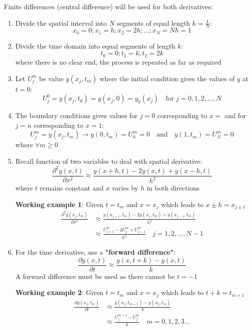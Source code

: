 \documentclass[10pt,a4paper]{article}
\begin{document}
Finite differences (central difference) will be used for both derivatives:
\begin{enumerate}
    \item Divide the spatial interval into $N$ segments of equal length $h=\frac{1}{N}$:
    $$
        x_0=0;x_1=h;x_2=2h;\dots;x_N=Nh=1
    $$

    \item Divide the time domain into equal segments of length $k$:
    $$
        t_0=0;t_1=k;t_2=2k
    $$
    where there is no clear end, the process is repeated as far as required

    \item Let $U_j^m$ be value $y(x_j,t_m)$ where the initial condition gives the values of $y$ at $t=0$:
    $$
        U_j^0=y(x_j,t_0)=y(x_j,0) = y_0(x_j) \quad \text{for } j=0,1,2,\dots, N
    $$

    \item The boundary conditions gives values for $j=0$ corresponding to $x=$ and for $j=n$
    corresponding to $x=1$:
    $$
        U_j^m=y(x_j,t_m) \rightarrow y(0,t_m) = U_0^m = 0 \quad \text{and} \quad y(1,t_m)=U_N^m = 0
    $$
    where $\forall m \geq 0$

    \item Recall function of two variables to deal with spatial derivative:
    $$
        \frac{\partial^2y(x,t)}{\partial x^2} \approx \frac{y(x+h,t)-2y(x,t)+y(x-h,t)}{h^2}
    $$
    where $t$ remains constant and $x$ varies by $h$ in both directions \par 

    \textbf{Working example 1}: Given $t=t_m$ and $x=x_j$ which leads to $x\pm h = x_{j\pm 1}$
    \begin{align*}
        \frac{\partial^2 y(x_j,t_m)}{\partial x^2} &\approx \frac{y(x_{j+1},t_m) - 2y(x_j,t_m)+y(x_{j-1},t_m)}{h^2} \\
        &\approx \frac{U_{j+1}^m - 2U_j^m + U_{j-1}^m}{h^2} \quad j=1,2,\dots,N-1
    \end{align*}

    \item For the time derivative, use a \textbf{"forward difference"}:
    $$
        \frac{\partial y(x,t)}{\partial t} \approx \frac{y(x,t+k)-y(x,t)}{k}
    $$
    A forward difference must be used as there cannot be $t=-1$ \par 

    \textbf{Working example 2}: Given $t=t_m$ and $x=x_j$ which leads to $t+k = t_{m+1}$
    \begin{align*}
        \frac{\partial y(x_j,t_m)}{\partial t} &\approx \frac{y(x_j,t_{m+1})-y(x_j,t_m)}{k} \\
        &\approx \frac{U_j^{m+1}-U_j^m}{k} \quad m=0,1,2,3\dots
    \end{align*}


\end{enumerate}
\end{document}
